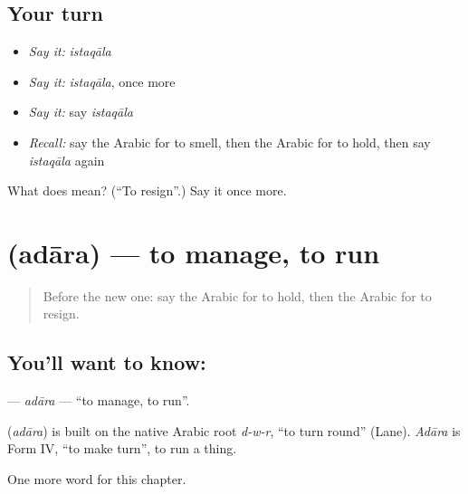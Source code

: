 \subsection*{Your turn}
\begin{itemize}
\raggedright
  \item \emph{Say it:} \emph{istaqāla}
  \item \emph{Say it:} \emph{istaqāla}, once more
  \item \emph{Say it:} say \emph{istaqāla}
  \item \emph{Recall:} say the Arabic for to smell, then the Arabic for to hold, then say \emph{istaqāla} again
\end{itemize}

\begin{tcolorbox}[breakable,colback=teal!4,colframe=teal!35!black,title={Before you move on}]
What does  mean? (\textquotedblleft{}To resign\textquotedblright{}.) Say it once more.
\end{tcolorbox}
\section[\texorpdfstring{\ar{أدار} (adāra)}{أدار (adāra)}]{ (adāra) — to manage, to run}

\label{lesson:AR-C195-adara}



\begin{quote}
Before the new one: say the Arabic for to hold, then the Arabic for to resign.
\end{quote}

\subsection*{You'll want to know: }
\textbf{} — \emph{adāra} — \textquotedblleft{}to manage, to run\textquotedblright{}.

\begin{cousinweb}
\textbf{} (\emph{adāra}) is built on the native Arabic root \emph{d-w-r}, \textquotedblleft{}to turn round\textquotedblright{} (Lane). \emph{Adāra} is Form IV, \textquotedblleft{}to make turn\textquotedblright{}, to run a thing.
\end{cousinweb}

\begin{grammarlens}[title={What you've built}]
One more word for this chapter.
\end{grammarlens}

